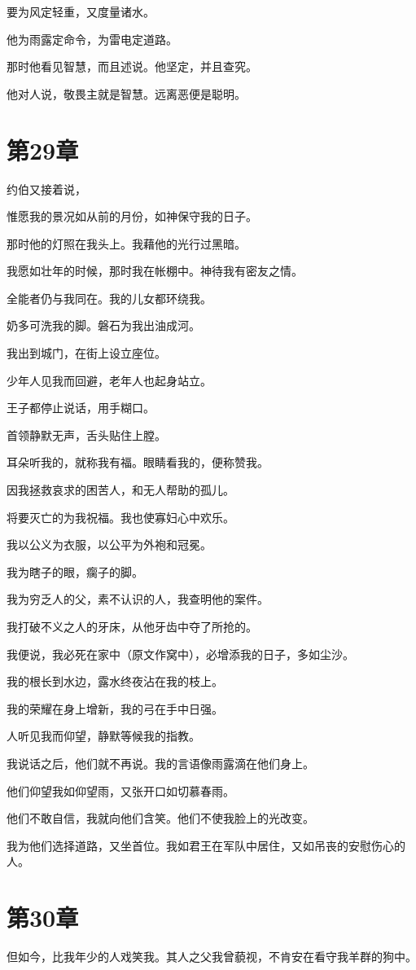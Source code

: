 \documentclass[12pt,oneside]{book}
\begin{document}
要为风定轻重，又度量诸水。

他为雨露定命令，为雷电定道路。

那时他看见智慧，而且述说。他坚定，并且查究。

他对人说，敬畏主就是智慧。远离恶便是聪明。


\chapter{第29章}
约伯又接着说，

惟愿我的景况如从前的月份，如神保守我的日子。

那时他的灯照在我头上。我藉他的光行过黑暗。

我愿如壮年的时候，那时我在帐棚中。神待我有密友之情。

全能者仍与我同在。我的儿女都环绕我。

奶多可洗我的脚。磐石为我出油成河。

我出到城门，在街上设立座位。

少年人见我而回避，老年人也起身站立。

王子都停止说话，用手糊口。

首领静默无声，舌头贴住上膛。

耳朵听我的，就称我有福。眼睛看我的，便称赞我。

因我拯救哀求的困苦人，和无人帮助的孤儿。

将要灭亡的为我祝福。我也使寡妇心中欢乐。

我以公义为衣服，以公平为外袍和冠冕。

我为瞎子的眼，瘸子的脚。

我为穷乏人的父，素不认识的人，我查明他的案件。

我打破不义之人的牙床，从他牙齿中夺了所抢的。

我便说，我必死在家中（原文作窝中），必增添我的日子，多如尘沙。

我的根长到水边，露水终夜沾在我的枝上。

我的荣耀在身上增新，我的弓在手中日强。

人听见我而仰望，静默等候我的指教。

我说话之后，他们就不再说。我的言语像雨露滴在他们身上。

他们仰望我如仰望雨，又张开口如切慕春雨。

他们不敢自信，我就向他们含笑。他们不使我脸上的光改变。

我为他们选择道路，又坐首位。我如君王在军队中居住，又如吊丧的安慰伤心的人。


\chapter{第30章}
但如今，比我年少的人戏笑我。其人之父我曾藐视，不肯安在看守我羊群的狗中。
\end{document}
